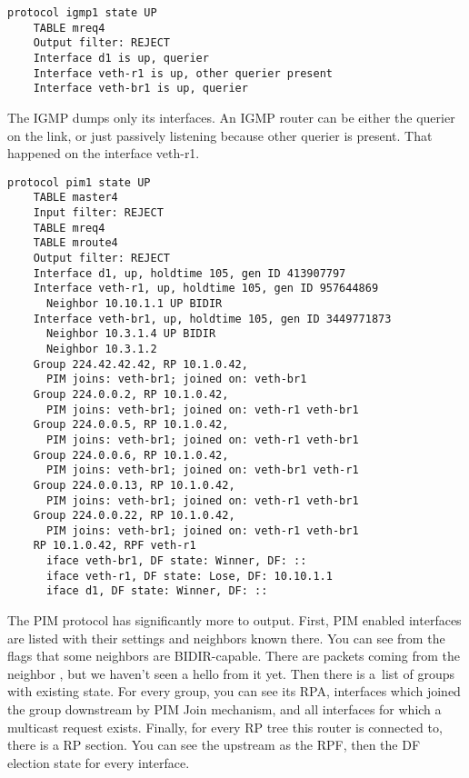 \begin{lstlisting}[firstnumber=8]
  protocol igmp1 state UP
    TABLE mreq4
    Output filter: REJECT
    Interface d1 is up, querier
    Interface veth-r1 is up, other querier present
    Interface veth-br1 is up, querier
\end{lstlisting}

\noindent The IGMP dumps only its interfaces. An IGMP router can be either the querier on
the link, or just passively listening because other querier is present. That
happened on the interface veth-r1.

\begin{lstlisting}[firstnumber=14]
  protocol pim1 state UP
    TABLE master4
    Input filter: REJECT
    TABLE mreq4
    TABLE mroute4
    Output filter: REJECT
    Interface d1, up, holdtime 105, gen ID 413907797
    Interface veth-r1, up, holdtime 105, gen ID 957644869
      Neighbor 10.10.1.1 UP BIDIR
    Interface veth-br1, up, holdtime 105, gen ID 3449771873
      Neighbor 10.3.1.4 UP BIDIR
      Neighbor 10.3.1.2
    Group 224.42.42.42, RP 10.1.0.42,
      PIM joins: veth-br1; joined on: veth-br1
    Group 224.0.0.2, RP 10.1.0.42,
      PIM joins: veth-br1; joined on: veth-r1 veth-br1
    Group 224.0.0.5, RP 10.1.0.42,
      PIM joins: veth-br1; joined on: veth-r1 veth-br1
    Group 224.0.0.6, RP 10.1.0.42,
      PIM joins: veth-br1; joined on: veth-br1 veth-r1
    Group 224.0.0.13, RP 10.1.0.42,
      PIM joins: veth-br1; joined on: veth-r1 veth-br1
    Group 224.0.0.22, RP 10.1.0.42,
      PIM joins: veth-br1; joined on: veth-r1 veth-br1
    RP 10.1.0.42, RPF veth-r1
      iface veth-br1, DF state: Winner, DF: ::
      iface veth-r1, DF state: Lose, DF: 10.10.1.1
      iface d1, DF state: Winner, DF: ::
\end{lstlisting}

\noindent The PIM protocol has significantly more to output. First, PIM enabled
interfaces are listed with their settings and neighbors known there. You can
see from the flags that some neighbors are BIDIR-capable. There are packets coming
from the neighbor , but we haven't seen a hello from it yet. Then
there is a~list of groups with existing state. For every group, you can see its
RPA, interfaces which joined the group downstream by PIM Join mechanism, and
all interfaces for which a multicast request exists. Finally, for every RP tree
this router is connected to, there is a RP section. You can see the upstream as
the RPF, then the DF election state for every interface.
